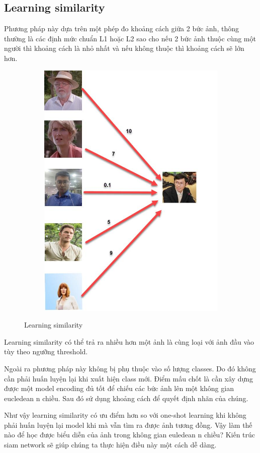 \subsection{Learning similarity}

Phương pháp này dựa trên một phép đo khoảng cách giữa 2 bức ảnh, thông thường là các định
mức chuẩn L1 hoặc L2 sao cho nếu 2 bức ảnh thuộc cùng một người thì khoảng cách là
nhỏ nhất và nếu không thuộc thì khoảng cách sẽ lớn hơn.

\begin{figure}
    \begin{subfigure}{1.\textwidth}
        \begin{center}
            \includegraphics[width=0.5\linewidth]{Chapters/items/chap2_15.jpg}
        \end{center}
        \label{fig:chap2_15}
    \end{subfigure}
    \caption{Learning similarity}
\end{figure}

Learning similarity có thể trả ra nhiều hơn một ảnh là cùng loại với ảnh đầu vào tùy theo ngưỡng threshold.

Ngoài ra phương pháp này không bị phụ thuộc vào số lượng classes.
Do đó không cần phải huấn luyện lại khi xuất hiện class mới.
Điểm mấu chốt là cần xây dựng được một model encoding đủ tốt để chiếu các bức
ảnh lên một không gian eucledean n chiều. Sau đó sử dụng khoảng cách để quyết
định nhãn của chúng.

Như vậy learning similarity có ưu điểm hơn so với one-shot learning khi không phải
huấn luyện lại model khi mà vẫn tìm ra được ảnh tương đồng.
Vậy làm thế nào để học được biểu diễn của ảnh trong không gian euledean n chiều?
Kiến trúc siam network sẽ giúp chúng ta thực hiện điều này một cách dễ dàng.

